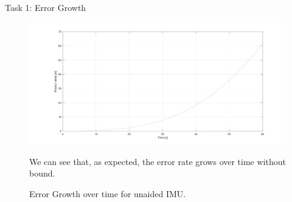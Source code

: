 \documentclass[10pt]{beamer}
\theoremstyle{definition}
\begin{document}
\begin{frame}{Task 1: Error Growth}
\begin{figure}
    \includegraphics[width=.8\textwidth]{images/error_growth.png}
    \caption{Error Growth over time for unaided IMU.}
    \label{fig:my_label}
    We can see that, as expected, the error rate grows over time without bound.
\end{figure}
\end{frame}
\end{document}
